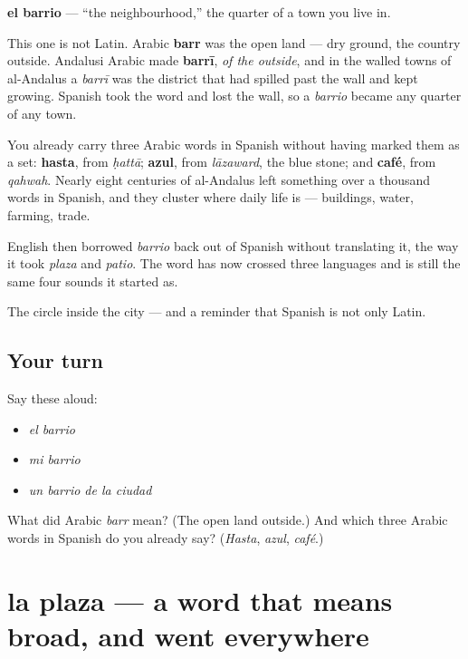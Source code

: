 \begin{cousinweb}
\textbf{el barrio} — \textquotedblleft{}the neighbourhood,\textquotedblright{} the quarter of a town you live in.

This one is not Latin. Arabic \textbf{barr} was the open land — dry ground, the country outside. Andalusi Arabic made \textbf{barrī}, \emph{of the outside}, and in the walled towns of al-Andalus a \emph{barrī} was the district that had spilled past the wall and kept growing. Spanish took the word and lost the wall, so a \emph{barrio} became any quarter of any town.

You already carry three Arabic words in Spanish without having marked them as a set: \textbf{hasta}, from \emph{ḥattā}; \textbf{azul}, from \emph{lāzaward}, the blue stone; and \textbf{café}, from \emph{qahwah}. Nearly eight centuries of al-Andalus left something over a thousand words in Spanish, and they cluster where daily life is — buildings, water, farming, trade.

English then borrowed \emph{barrio} back out of Spanish without translating it, the way it took \emph{plaza} and \emph{patio}. The word has now crossed three languages and is still the same four sounds it started as.
\end{cousinweb}

\begin{grammarlens}[title={What you've built}]
The circle inside the city — and a reminder that Spanish is not only Latin.
\end{grammarlens}

\subsection*{Your turn}
Say these aloud:

\begin{itemize}
\raggedright
  \item \emph{el barrio}
  \item \emph{mi barrio}
  \item \emph{un barrio de la ciudad}
\end{itemize}

\begin{tcolorbox}[breakable,colback=teal!4,colframe=teal!35!black,title={Before you move on}]
What did Arabic \emph{barr} mean? (The open land outside.) And which three Arabic words in Spanish do you already say? (\emph{Hasta}, \emph{azul}, \emph{café}.)
\end{tcolorbox}
\section[la plaza]{la plaza — a word that means broad, and went everywhere}

